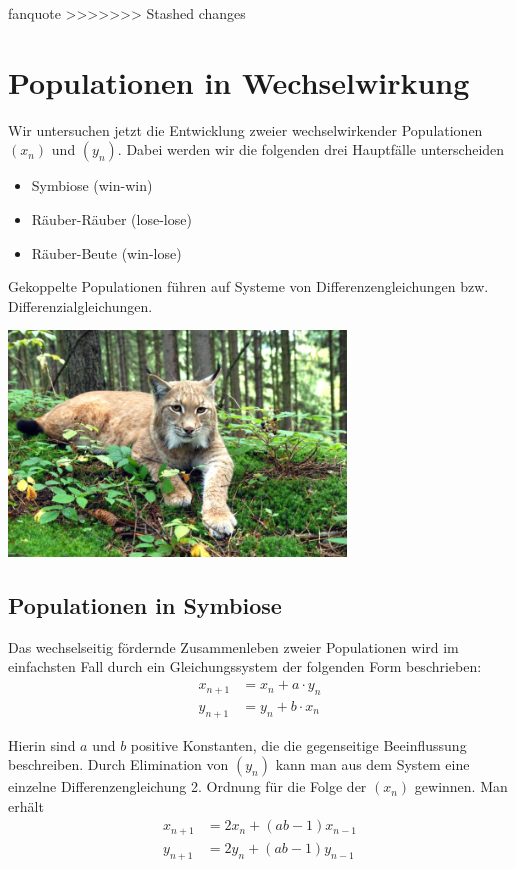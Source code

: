 \documentclass[%
<<<<<<< Updated upstream
<<<<<<< Updated upstream
11pt,%
twoside,%
titlepage,%
german,%
headsepline%
]{scrartcl}
\begin{document}
\begin{uebenv}{fanquote}
>>>>>>> Stashed changes
\clearpage

\section{Populationen in Wechselwirkung}
Wir
untersuchen jetzt die Entwicklung zweier wechselwirkender Populationen $(x_n)$ und $(y_n)$. Dabei werden wir die folgenden drei Hauptfälle unterscheiden

\begin{itemize}
\item Symbiose (win-win)
\item Räuber-Räuber (lose-lose)
\item Räuber-Beute (win-lose)
\end{itemize}

Gekoppelte Populationen führen auf Systeme von Differenzengleichungen bzw. Differenzialgleichungen.

\begin{center}
\includegraphics[height=6cm]{pictures/luchs.jpg}
\end{center}

\subsection{Populationen in Symbiose}
Das wechselseitig fördernde Zusammenleben zweier Populationen wird im einfachsten Fall durch ein Gleichungssystem der folgenden Form beschrieben:
\begin{align*}
x_{n+1} &= x_n+a\cdot y_n\\
y_{n+1} &= y_n+b\cdot x_n
\end{align*}

Hierin sind $a$ und $b$ positive Konstanten, die die gegenseitige Beeinflussung beschreiben. Durch Elimination von $(y_n)$ kann man aus dem System eine einzelne Differenzengleichung 2. Ordnung für die Folge der $(x_n)$ gewinnen. Man erhält
\begin{align*}
x_{n+1} &= 2x_n+(ab-1)x_{n-1}\\
y_{n+1} &= 2y_n+(ab-1)y_{n-1}
\end{align*}


\end{uebenv}
\end{document}

